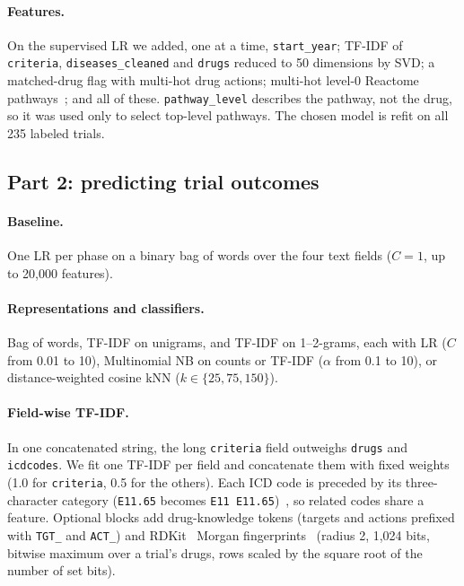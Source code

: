 \paragraph{Features.}
On the supervised LR we added, one at a time, \texttt{start\_year}; TF-IDF of \texttt{criteria}, \texttt{diseases\_cleaned} and \texttt{drugs} reduced to 50 dimensions by SVD; a matched-drug flag with multi-hot drug actions; multi-hot level-0 Reactome pathways~\cite{gillespie2022reactome}; and all of these.
\texttt{pathway\_level} describes the pathway, not the drug, so it was used only to select top-level pathways.
The chosen model is refit on all 235 labeled trials.

\subsection{Part 2: predicting trial outcomes}

\paragraph{Baseline.}
One LR per phase on a binary bag of words over the four text fields ($C=1$, up to 20,000 features).

\paragraph{Representations and classifiers.}
Bag of words, TF-IDF on unigrams, and TF-IDF on 1--2-grams, each with LR ($C$ from 0.01 to 10), Multinomial NB on counts or TF-IDF ($\alpha$ from 0.1 to 10), or distance-weighted cosine kNN ($k\in\{25,75,150\}$).

\paragraph{Field-wise TF-IDF.}
In one concatenated string, the long \texttt{criteria} field outweighs \texttt{drugs} and \texttt{icdcodes}.
We fit one TF-IDF per field and concatenate them with fixed weights (1.0 for \texttt{criteria}, 0.5 for the others).
Each ICD code is preceded by its three-character category (\texttt{E11.65} becomes \texttt{E11 E11.65})~\cite{who_icd10}, so related codes share a feature.
Optional blocks add drug-knowledge tokens (targets and actions prefixed with \texttt{TGT\_} and \texttt{ACT\_}) and RDKit~\cite{rdkit} Morgan fingerprints~\cite{rogers2010ecfp} (radius 2, 1,024 bits, bitwise maximum over a trial's drugs, rows scaled by the square root of the number of set bits).

